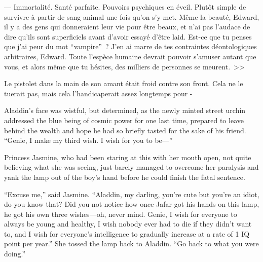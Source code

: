 --- Immortalité. Santé parfaite. Pouvoirs psychiques en éveil. Plutôt simple de survivre à partir de sang animal une fois qu'on s'y met. Même la beauté, Edward, il y a des gens qui donneraient leur vie pour être beaux, et n'ai pas l'audace de dire qu'ils sont superficiels avant d'avoir essayé d'être laid. Est-ce que tu penses que j'ai peur du mot “vampire”~? J'en ai marre de tes contraintes déontologiques arbitraires, Edward. Toute l'espèce humaine devrait pouvoir s'amuser autant que vous, et alors même que tu hésites, des milliers de personnes se meurent.~>>

Le pistolet dans la main de son amant était froid contre son front. Cela ne le tuerait pas, mais cela l'handicaperait assez longtemps pour -


Aladdin’s face was wistful, but determined, as the newly minted street urchin addressed the blue being of cosmic power for one last time, prepared to leave behind the wealth and hope he had so briefly tasted for the sake of his friend. “Genie, I make my third wish. I wish for you to be—”

Princess Jasmine, who had been staring at this with her mouth open, not quite believing what she was seeing, just barely managed to overcome her paralysis and yank the lamp out of the boy’s hand before he could finish the fatal sentence.

“Excuse me,” said Jasmine. “Aladdin, my darling, you’re cute but you’re an idiot, do you know that? Did you not notice how once Jafar got his hands on this lamp, he got his own three wishes—oh, never mind. Genie, I wish for everyone to always be young and healthy, I wish nobody ever had to die if they didn’t want to, and I wish for everyone’s intelligence to gradually increase at a rate of 1 IQ point per year.” She tossed the lamp back to Aladdin. “Go back to what you were doing.”

%
%

